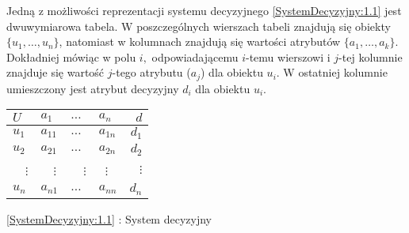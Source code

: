 \documentclass[magisterska]{pracamgr}
\theoremstyle{plain}
\theoremstyle{definition}
\theoremstyle{remark}
\begin{document}
Jedną z możliwości reprezentacji systemu decyzyjnego  \ref{SystemDecyzyjny:1.1} jest dwuwymiarowa tabela.
W poszczególnych wierszach tabeli znajdują się obiekty $\{u_1, \ldots, u_n \}$,
natomiast w kolumnach znajdują się wartości atrybutów $\{a_{1}, \ldots, a_{k} \}$.
Dokładniej mówiąc w polu $i,$ odpowiadającemu $i$-temu wierszowi i $j$-tej kolumnie
znajduje się wartość $j$-tego atrybutu ($a_{j}$) dla obiektu $u_{i}$.
W ostatniej kolumnie umieszczony jest atrybut decyzyjny $d_{i}$ dla obiektu $u_i$.

\begin{center}
  \begin{tabular}{  l || l l l | r }
  \label{SystemDecyzyjny:1.1}
    $U$ & $a_1$ & $\ldots$ & $a_n$ & $d$ \\ 
    \hline
  
    $u_1$ & $a_{11}$ & $\ldots $ & $a_{1n} $ & $d_{1}$ \\
    $u_2$ & $a_{21}$ & $\ldots $ & $a_{2n} $ & $d_{2}$ \\ 
    \ \ $\vdots$ & \ \ $\vdots$ & \ \ $\vdots$ & \   $\vdots$ & $\vdots$ \\ 
    $u_n$ & $a_{n1}$ & $\ldots $ & $a_{nn} $ & $d_{n}$ \\     
  \end{tabular}\par
  \bigskip 
  \ref{SystemDecyzyjny:1.1} : System decyzyjny

\end{center}
\end{document}
